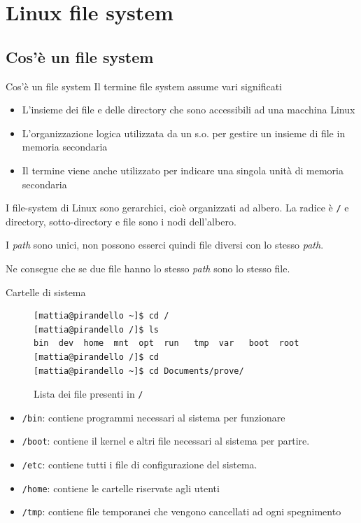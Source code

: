 \section{Linux file system}

\subsection{Cos'è un file system}
\begin{frame}{Cos'è un file system}
  Il termine file system assume vari significati
  \begin{itemize}
    \item L'insieme dei file e delle directory che sono accessibili ad una macchina Linux
    \item L'organizzazione logica utilizzata da un s.o. per gestire un insieme di file in
memoria secondaria
    \item Il termine viene anche utilizzato per indicare una singola unità di memoria
secondaria
  \end{itemize}

  I file-system di Linux sono gerarchici, cioè organizzati ad albero. La radice
  è \texttt{/} e directory, sotto-directory e file sono i nodi dell'albero. \bigskip

  I \textit{path} sono unici, non possono esserci quindi file diversi con lo 
  stesso \textit{path}. \bigskip

  Ne consegue che se due file hanno lo stesso \textit{path} sono lo stesso file.
  \bigskip
\end{frame}

\begin{frame}[fragile]{Cartelle di sistema}
  \begin{figure}
    \begin{lstlisting}[basicstyle=\footnotesize]
[mattia@pirandello ~]$ cd /
[mattia@pirandello /]$ ls
bin  dev  home  mnt  opt  run   tmp  var   boot  root
[mattia@pirandello /]$ cd
[mattia@pirandello ~]$ cd Documents/prove/
    \end{lstlisting}
    \caption{Lista dei file presenti in \texttt{/}}
  \end{figure}
  \begin{itemize}
    \item \texttt{/bin}: contiene programmi necessari al sistema per funzionare
    \item \texttt{/boot}: contiene il kernel e altri file necessari al sistema
      per partire.
    \item \texttt{/etc}: contiene tutti i file di configurazione del sistema.
    \item \texttt{/home}: contiene le cartelle riservate agli utenti
    \item \texttt{/tmp}: contiene file temporanei che vengono cancellati ad ogni
      spegnimento
  \end{itemize}
\end{frame}


